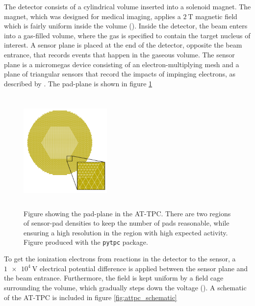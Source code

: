  The detector consists of a cylindrical volume inserted into a solenoid magnet. The magnet, which was designed for medical imaging, applies a $\SI{2}{\tesla}$ magnetic field which is fairly uniform inside the volume (\cite{Bradt2017a}). Inside the detector, the beam enters into a gas-filled volume, where the gas is specified to contain the target nucleus of interest. A sensor plane is placed at the end of the detector, opposite the beam entrance, that records events that happen in the gaseous volume. The sensor plane is a micromegas device consisting of an electron-multiplying mesh and a plane of triangular sensors that record the impacts of impinging electrons, as described by \citet{Giomataris1996}. The pad-plane is shown in figure \ref{fig:attpc_padplane}

 \begin{figure}
\centering
\includegraphics[width=0.4\textwidth, height=6cm]{../plots/at_tpc_padplane}
\caption{Figure showing the pad-plane in the AT-TPC. There are two regions of sensor-pad densities to keep the number of pads reasonable, while ensuring a high resolution in the region with high expected activity. Figure produced with the \lstinline{pytpc} package.}\label{fig:attpc_padplane}
 \end{figure}

 To get the ionization electrons from reactions in the detector to the sensor, a $\SI{1e4}{\volt}$ electrical potential difference is applied between the sensor plane and the beam entrance. Furthermore, the field is kept uniform by a field cage surrounding the volume, which gradually steps down the voltage (\cite{Bradt2017a}). A schematic of the AT-TPC is included in figure \ref{fig:attpc_schematic}

